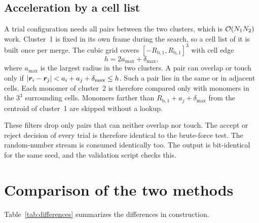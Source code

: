 \documentclass[11pt,a4paper]{article}
\newcommand{\dmax}{\delta_\text{max}}
\begin{document}
\subsection{Acceleration by a cell list}
\label{sec:cell-list}

A trial configuration needs all pairs between the two clusters, which is $\order{N_1 N_2}$ work.
Cluster~1 is fixed in its own frame during the search, so a cell list of it is built once per merge.
The cubic grid covers $[-R_{\text{b},1}, R_{\text{b},1}]^3$ with cell edge
\begin{equation}
  h = 2 a_\text{max} + \dmax ,
  \label{eq:cell-edge}
\end{equation}
where $a_\text{max}$ is the largest radius in the two clusters.
A pair can overlap or touch only if $\abs{\bm{r}_i - \bm{r}_j} < a_i + a_j + \dmax \le h$.
Such a pair lies in the same or in adjacent cells.
Each monomer of cluster~2 is therefore compared only with monomers in the $3^3$ surrounding cells.
Monomers farther than $R_{\text{b},1} + a_j + \dmax$ from the centroid of cluster~1 are skipped without a lookup.

These filters drop only pairs that can neither overlap nor touch.
The accept or reject decision of every trial is therefore identical to the brute-force test.
The random-number stream is consumed identically too.
The output is bit-identical for the same seed, and the validation script checks this.

\section{Comparison of the two methods}
\label{sec:comparison}

Table~\ref{tab:differences} summarizes the differences in construction.
\end{document}
